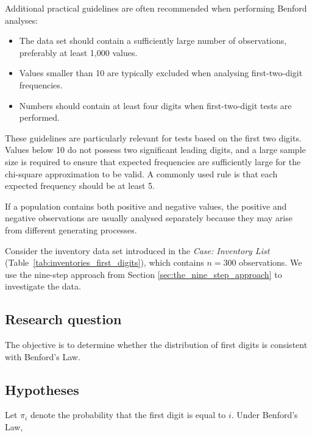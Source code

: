 Additional practical guidelines are often recommended when performing
Benford analyses:

\begin{itemize}
    \item The data set should contain a sufficiently large number of
    observations, preferably at least 1,000 values.
    \item Values smaller than 10 are typically excluded when analysing
    first-two-digit frequencies.
    \item Numbers should contain at least four digits when first-two-digit
    tests are performed.
\end{itemize}

These guidelines are particularly relevant for tests based on the first two
digits. Values below 10 do not possess two significant leading digits, and a
large sample size is required to ensure that expected frequencies are
sufficiently large for the chi-square approximation to be valid. A commonly
used rule is that each expected frequency should be at least 5.

If a population contains both positive and negative values, the positive and
negative observations are usually analysed separately because they may arise
from different generating processes.

\medskip
Consider the inventory data set introduced in the \textit{Case: Inventory
List} (Table~\ref{tab:inventories_first_digits}), which contains
$n=300$ observations. We use the nine-step approach from Section \ref{sec:the_nine_step_approach} to investigate the data.

\subsection{Research question}

The objective is to determine whether the distribution
of first digits is consistent with Benford's Law.

\subsection{Hypotheses}

Let $\pi_i$ denote the probability that the first digit is equal to $i$. Under Benford's Law,

